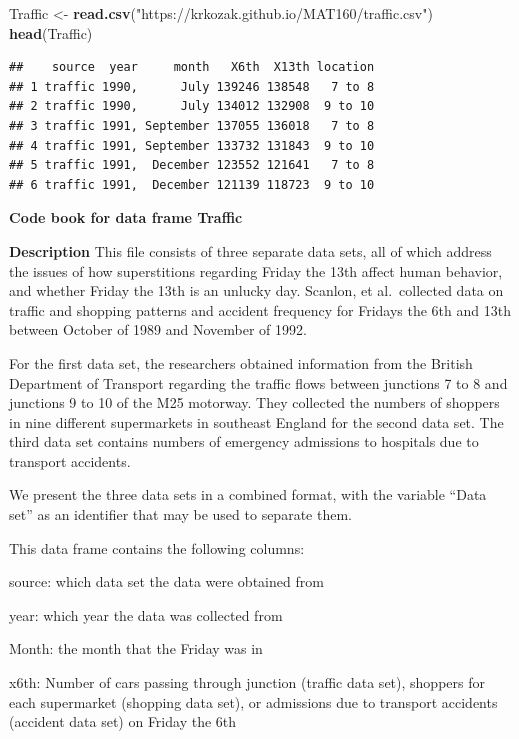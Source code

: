 \documentclass[]{book}
\newenvironment{Shaded}{\begin{snugshade}}{\end{snugshade}}
\newcommand{\KeywordTok}[1]{\textcolor[rgb]{0.13,0.29,0.53}{\textbf{#1}}}
\newcommand{\NormalTok}[1]{#1}
\newcommand{\StringTok}[1]{\textcolor[rgb]{0.31,0.60,0.02}{#1}}
\begin{document}
\begin{Shaded}
\begin{Highlighting}[]
\NormalTok{Traffic <-}\StringTok{ }\KeywordTok{read.csv}\NormalTok{(}\StringTok{"https://krkozak.github.io/MAT160/traffic.csv"}\NormalTok{)}
\KeywordTok{head}\NormalTok{(Traffic)}
\end{Highlighting}
\end{Shaded}

\begin{verbatim}
##    source  year     month   X6th  X13th location
## 1 traffic 1990,      July 139246 138548   7 to 8
## 2 traffic 1990,      July 134012 132908  9 to 10
## 3 traffic 1991, September 137055 136018   7 to 8
## 4 traffic 1991, September 133732 131843  9 to 10
## 5 traffic 1991,  December 123552 121641   7 to 8
## 6 traffic 1991,  December 121139 118723  9 to 10
\end{verbatim}

\textbf{Code book for data frame Traffic}

\textbf{Description}
This file consists of three separate data sets, all of which address the issues of how superstitions regarding Friday the 13th affect human behavior, and whether Friday the 13th is an unlucky day. Scanlon, et al.~collected data on traffic and shopping patterns and accident frequency for Fridays the 6th and 13th between October of 1989 and November of 1992.

For the first data set, the researchers obtained information from the British Department of Transport regarding the traffic flows between junctions 7 to 8 and junctions 9 to 10 of the M25 motorway. They collected the numbers of shoppers in nine different supermarkets in southeast England for the second data set. The third data set contains numbers of emergency admissions to hospitals due to transport accidents.

We present the three data sets in a combined format, with the variable ``Data set'' as an identifier that may be used to separate them.

This data frame contains the following columns:

source: which data set the data were obtained from

year: which year the data was collected from

Month: the month that the Friday was in

x6th: Number of cars passing through junction (traffic data set), shoppers for each supermarket (shopping data set), or admissions due to transport accidents (accident data set) on Friday the 6th
\end{document}
